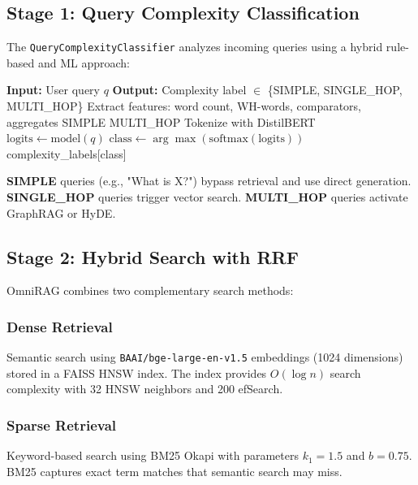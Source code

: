 \documentclass[conference]{IEEEtran}
\begin{document}
\subsection{Stage 1: Query Complexity Classification}

The \texttt{QueryComplexityClassifier} analyzes incoming queries using a hybrid rule-based and ML approach:

\begin{algorithm}[htbp]
\caption{Query Complexity Classification}
\label{alg:classify}
\begin{algorithmic}[1]
\STATE \textbf{Input:} User query $q$
\STATE \textbf{Output:} Complexity label $\in$ \{SIMPLE, SINGLE\_HOP, MULTI\_HOP\}
\STATE
\STATE Extract features: word count, WH-words, comparators, aggregates
    \RETURN SIMPLE
    \RETURN MULTI\_HOP
\ELSE
    \STATE Tokenize with DistilBERT
    \STATE $\text{logits} \leftarrow \text{model}(q)$
    \STATE $\text{class} \leftarrow \arg\max(\text{softmax}(\text{logits}))$
    \RETURN complexity\_labels[class]
\ENDIF
\end{algorithmic}
\end{algorithm}

\textbf{SIMPLE} queries (e.g., "What is X?") bypass retrieval and use direct generation. \textbf{SINGLE\_HOP} queries trigger vector search. \textbf{MULTI\_HOP} queries activate GraphRAG or HyDE.

\subsection{Stage 2: Hybrid Search with RRF}

OmniRAG combines two complementary search methods:

\subsubsection{Dense Retrieval}
Semantic search using \texttt{BAAI/bge-large-en-v1.5} embeddings (1024 dimensions) stored in a FAISS HNSW index. The index provides $O(\log n)$ search complexity with 32 HNSW neighbors and 200 efSearch.

\subsubsection{Sparse Retrieval}
Keyword-based search using BM25 Okapi with parameters $k_1=1.5$ and $b=0.75$. BM25 captures exact term matches that semantic search may miss.
\end{document}

